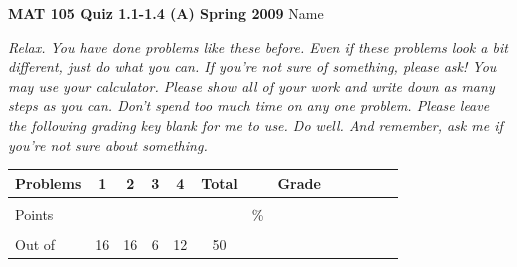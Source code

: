 \documentclass[12pt]{article}
\begin{document}
{\bf MAT 105 Quiz 1.1-1.4 (A) Spring 2009} \hspace{.4in} {\large Name} \hrulefill

\hrulefill

 \emph{Relax.  You have done problems like these before.  Even if these problems look a bit different, just do what you can.  If you're not sure of something, please ask! You may use your calculator.  Please show all of your work and write down as many steps as you can.  Don't spend too much time on any one problem.  Please leave the following grading key blank for me to use.  Do well.  And remember, ask me if you're not sure about something.}

\begin{center}

\begin{tabular}
{|l|c|c|c|c|c|c|c|c|c|c|c|c|} \hline

 Problems & \hspace{5 pt} 1 \hspace{5 pt}  & \hspace{5 pt} 2 \hspace{5 pt} & \hspace{5 pt} 3 \hspace{5 pt} & \hspace{5 pt} 4 \hspace{5 pt} &  \hspace{5 pt} Total  \hspace{5 pt} & &  \hspace{5 pt} Grade \hspace{5 pt}  \\ \hline
&&&&& &&\\  
Points &&&&& &    \hspace{.8in}\% &  \\ 
&&&&& && \\  \hline
Out of & 16 & 16 & 6 & 12 &50 & & \\ \hline

\end {tabular}

\end{center}

\hrulefill
\end{document}
